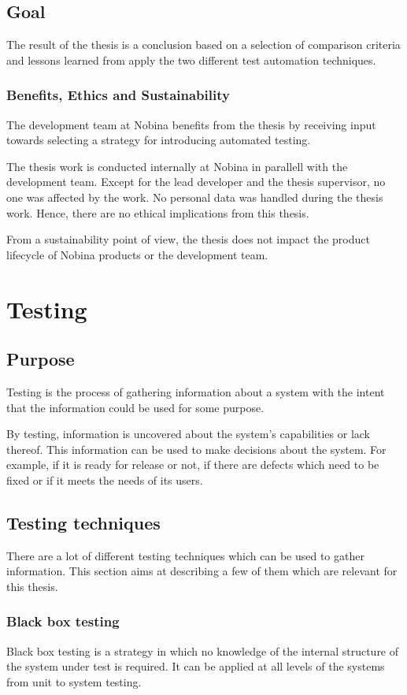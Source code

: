 \documentclass{article}
\begin{document}
	\subsection{Goal}
		The result of the thesis is a conclusion based on a selection of comparison criteria and lessons learned from apply the two different test automation techniques.

		\subsubsection{Benefits, Ethics and Sustainability}
		The development team at Nobina benefits from the thesis by receiving input towards selecting a strategy for introducing automated testing.

		The thesis work is conducted internally at Nobina in parallell with the development team. Except for the lead developer and the thesis supervisor, no one was affected by the work. No personal data was handled during the thesis work. Hence, there are no ethical implications from this thesis. 

		From a sustainability point of view, the thesis does not impact the product lifecycle of Nobina products or the development team. 

	\section{Testing}
		\subsection{Purpose}
		Testing is the process of gathering information about a system with the intent that the information could be used for some purpose. \cite{perfect}

		By testing, information is uncovered about the system's capabilities or lack thereof. This information can be used to make decisions about the system. For example, if it is ready for release or not, if there are defects which need to be fixed or if it meets the needs of its users.
			
		\subsection{Testing techniques}
		There are a lot of different testing techniques which can be used to gather information. This section aims at describing a few of them which are relevant for this thesis.
			
			\subsubsection{Black box testing}
			Black box testing is a strategy in which no knowledge of the internal structure of the system under test is required. It can be applied at all levels of the systems from unit to system testing. 
\end{document}
